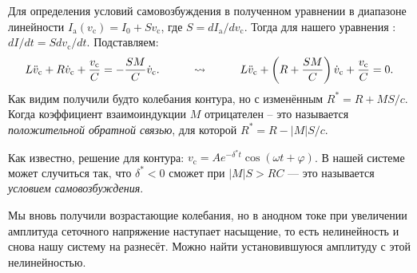 Для определения условий самовозбуждения в полученном уравнении в диапазоне линейности $I_{\text{a}}(v_\text{c}) = I_0 + S v_\text{c}$, где $S = d I_\text{a} / d v_\text{c} $. Тогда для нашего уравнения : $d I/ d t = S d v_\text{c}/d t$. Подставляем:
\begin{equation}
	L \ddot{v}_\text{c} +R \dot{v}_\text{c}+ \frac{v_\text{c}}{C} = - \frac{S M}{C} \dot{v}_\text{c}.
	\hspace*{1 cm} \leadsto \hspace*{1 cm} L \ddot{v}_\text{c} +\left(R + \frac{S M}{C}\right)\dot{v}_\text{c}+ \frac{v_\text{c}}{C} = 0.
\end{equation}
Как видим получили будто колебания контура, но с изменённым $R^* = R + M S /c $. Когда коэффициент взаимоиндукции $M$ отрицателен -- это называется \textit{положительной обратной связью}, для которой $R^* = R - |M| S /c $. 

Как известно, решение для контура: $v_\text{c} = A e^{-\delta^* t} \cos (\omega t + \varphi) $.
В нашей системе может случиться так, что $\delta^* < 0$ сможет при $|M| S > R C$ --- это называется \textit{условием самовозбуждения}.

Мы вновь получили возрастающие колебания, но в анодном токе при увеличении амплитуда сеточного напряжение наступает насыщение, то есть нелинейность и снова нашу систему на разнесёт. Можно найти установившуюся амплитуду с этой нелинейностью.